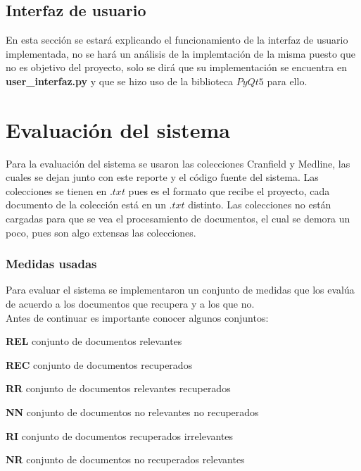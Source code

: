 \documentclass{llncs}
\begin{document}
\subsection{Interfaz de usuario}
En esta secci\'on se estar\'a explicando el funcionamiento de la interfaz de usuario implementada, no se har\'a un an\'alisis de la implemtaci\'on de la misma puesto que no es objetivo del proyecto, solo se dir\'a que su implementaci\'on se encuentra en \textbf{user\_interfaz.py} y que se hizo uso de la biblioteca $PyQt5$ para ello.\\

%
\section{Evaluaci\'on del sistema}
% 

Para la evaluaci\'on del sistema se usaron las colecciones Cranfield y Medline, las cuales se dejan junto con este reporte y el c\'odigo fuente del sistema. Las colecciones se tienen en $.txt$ pues es el formato que recibe el proyecto, cada documento de la colecci\'on est\'a en un $.txt$ distinto. Las colecciones no est\'an cargadas para que se vea el procesamiento de documentos, el cual se demora un poco, pues son algo extensas las colecciones.\\

\subsubsection{Medidas usadas}

Para evaluar el sistema se implementaron un conjunto de medidas que los eval\'ua de acuerdo a los documentos que recupera y a los que no.\\

Antes de continuar es importante conocer algunos conjuntos:\\

\begin{list}{-}{•}
\item \textbf{REL} conjunto de documentos relevantes
\item \textbf{REC} conjunto de documentos recuperados
\item \textbf{RR} conjunto de documentos relevantes recuperados
\item \textbf{NN} conjunto de documentos no relevantes no recuperados
\item \textbf{RI} conjunto de documentos recuperados irrelevantes
\item \textbf{NR} conjunto de documentos no recuperados relevantes
\end{list}
\end{document}
